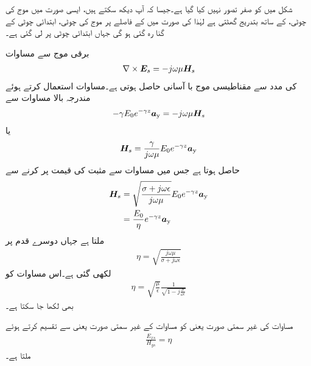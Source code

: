شکل  میں  کو صفر تصور نہیں کیا گیا ہے۔جیسا کہ آپ دیکھ سکتے ہیں، ایسی صورت میں موج کی چوٹی،  کے ساتھ بتدریج گھٹتی  ہے لہٰذا  کی صورت میں  کے فاصلے پر موج کی چوٹی، ابتدائی چوٹی کے  گنا رہ گئی ہو گی جہاں ابتدائی چوٹی  پر لی گئی ہے۔

برقی موج  سے مساوات 
\begin{align*}
\nabla \times {\ensuremath{{\boldsymbol{E}}}}_{s}=-j \omega \mu {\ensuremath{{\boldsymbol{H}}}}_{s}
\end{align*}
 کی مدد سے مقناطیسی موج با آسانی حاصل ہوتی ہے۔مساوات  استعمال کرتے ہوئے مندرجہ بالا مساوات سے
\begin{align*}
-\gamma E_0 e^{-\gamma z} {\boldsymbol{a}}_{\textup{y}}=-j \omega \mu {\ensuremath{{\boldsymbol{H}}}}_s
\end{align*}
یا
\begin{align*}
{\ensuremath{{\boldsymbol{H}}}}_s=\frac{\gamma}{j \omega \mu} E_0 e^{-\gamma z} {\boldsymbol{a}}_{\textup{y}}
\end{align*}
حاصل ہوتا ہے جس میں مساوات  سے مثبت  کی قیمت پر کرنے سے
\begin{gather}
\begin{aligned}\label{مساوات_موج_مقناطیسی_جزو}
{\ensuremath{{\boldsymbol{H}}}}_s&=\sqrt{\frac{\sigma +j \omega \epsilon}{j \omega \mu}} E_0 e^{-\gamma z} {\boldsymbol{a}}_{\textup{y}}\\
&=\frac{E_0}{\eta} e^{-\gamma z}{\boldsymbol{a}}_{\textup{y}}
\end{aligned}
\end{gather}
ملتا ہے جہاں دوسرے قدم پر
\begin{align}\label{مساوات-موج_قدرتی_رکاوٹ}
\eta =\sqrt{\frac{j \omega \mu}{\sigma +j \omega \epsilon}}
\end{align}
لکھی گئی ہے۔اس مساوات کو
\begin{align}\label{مساوات-موج_قدرتی_رکاوٹ_ب}
\eta =\sqrt{\frac{\mu}{\epsilon}}\frac{1}{\sqrt{1-j \frac{\sigma}{\omega \epsilon}}}
\end{align}
بھی لکھا جا سکتا ہے۔

مساوات  کی غیر سمتی صورت یعنی  کو مساوات  کے غیر سمتی صورت یعنی  سے تقسیم کرتے ہوئے
\begin{align}
\frac{E_{xs}}{H_{ys}}=\eta
\end{align}
ملتا ہے۔

